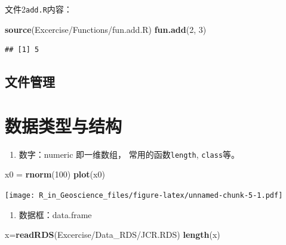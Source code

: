 \documentclass[]{scrbook}
\newenvironment{Shaded}{\begin{snugshade}}{\end{snugshade}}
\newcommand{\DecValTok}[1]{\textcolor[rgb]{0.00,0.00,0.81}{#1}}
\newcommand{\KeywordTok}[1]{\textcolor[rgb]{0.13,0.29,0.53}{\textbf{#1}}}
\newcommand{\NormalTok}[1]{#1}
\newcommand{\StringTok}[1]{\textcolor[rgb]{0.31,0.60,0.02}{#1}}
\providecommand{\tightlist}{%
  \setlength{\itemsep}{0pt}\setlength{\parskip}{0pt}}
\begin{document}
文件2\texttt{add.R}内容：

\begin{Shaded}
\begin{Highlighting}[]
\KeywordTok{source}\NormalTok{(}\StringTok{\textquotesingle{}Excercise/Functions/fun.add.R\textquotesingle{}}\NormalTok{)}
\KeywordTok{fun.add}\NormalTok{(}\DecValTok{2}\NormalTok{, }\DecValTok{3}\NormalTok{)}
\end{Highlighting}
\end{Shaded}

\begin{verbatim}
## [1] 5
\end{verbatim}

\hypertarget{ux6587ux4ef6ux7ba1ux7406}{%
\subsection{文件管理}\label{ux6587ux4ef6ux7ba1ux7406}}

\hypertarget{ux6570ux636eux7c7bux578bux4e0eux7ed3ux6784}{%
\section{数据类型与结构}\label{ux6570ux636eux7c7bux578bux4e0eux7ed3ux6784}}

\begin{enumerate}
\def\labelenumi{\arabic{enumi}.}
\tightlist
\item
  数字：numeric
  即一维数组， 常用的函数\texttt{length}, \texttt{class}等。
\end{enumerate}

\begin{Shaded}
\begin{Highlighting}[]
\NormalTok{x0 =}\StringTok{ }\KeywordTok{rnorm}\NormalTok{(}\DecValTok{100}\NormalTok{)}
\KeywordTok{plot}\NormalTok{(x0)}
\end{Highlighting}
\end{Shaded}

\texttt{[image: R\_in\_Geoscience\_files/figure-latex/unnamed-chunk-5-1.pdf]}

\begin{enumerate}
\def\labelenumi{\arabic{enumi}.}
\tightlist
\item
  数据框：data.frame
\end{enumerate}

\begin{Shaded}
\begin{Highlighting}[]
\NormalTok{x=}\KeywordTok{readRDS}\NormalTok{(}\StringTok{\textquotesingle{}Excercise/Data\_RDS/JCR.RDS\textquotesingle{}}\NormalTok{)}
\KeywordTok{length}\NormalTok{(x)}
\end{Highlighting}
\end{Shaded}
\end{document}
